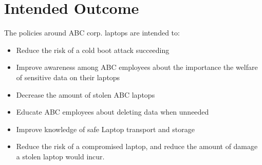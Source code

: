 \documentclass[10pt, twocolumn]{article}
\numberwithin{equation}{section} %
\numberwithin{figure}{section} %
\numberwithin{table}{section} %
\begin{document}
\section{Intended Outcome}
The policies around ABC corp. laptops are intended to: 
\begin{itemize}
	\item Reduce the risk of a cold boot attack succeeding
	\item Improve awareness among ABC employees about the importance the welfare of sensitive data on their laptops
	\item Decrease the amount of stolen ABC laptops
	\item Educate ABC employees about deleting data when unneeded
	\item Improve knowledge of safe Laptop transport and storage 
	\item Reduce the risk of a compromised laptop, and reduce the amount of damage a stolen laptop would incur.
\end{itemize}
\newpage
\end{document}
